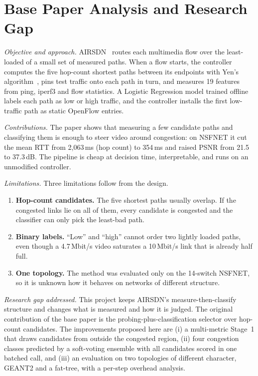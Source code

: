\documentclass[conference,a4paper]{IEEEtran}
\begin{document}
\section{Base Paper Analysis and Research Gap}
\textit{Objective and approach.} AIRSDN~\cite{ipek2025airsdn} routes each multimedia flow over the least-loaded of a
small set of measured paths. When a flow starts, the controller computes the five hop-count shortest paths between
its endpoints with Yen's algorithm~\cite{yen1971kshortest}, pins test traffic onto each path in turn, and measures
19 features from ping, iperf3 and flow statistics. A Logistic Regression model trained offline labels each path as
low or high traffic, and the controller installs the first low-traffic path as static OpenFlow entries.

\textit{Contributions.} The paper shows that measuring a few candidate paths and classifying them is enough to steer
video around congestion: on NSFNET it cut the mean RTT from 2,063\,ms (hop count) to 354\,ms and raised PSNR from
21.5 to 37.3\,dB. The pipeline is cheap at decision time, interpretable, and runs on an unmodified controller.

\textit{Limitations.} Three limitations follow from the design.
\begin{enumerate}
\item \textbf{Hop-count candidates.} The five shortest paths usually overlap. If the congested links lie on all of
them, every candidate is congested and the classifier can only pick the least-bad path.
\item \textbf{Binary labels.} ``Low'' and ``high'' cannot order two lightly loaded paths, even though a 4.7\,Mbit/s
video saturates a 10\,Mbit/s link that is already half full.
\item \textbf{One topology.} The method was evaluated only on the 14-switch NSFNET, so it is unknown how it behaves
on networks of different structure.
\end{enumerate}

\textit{Research gap addressed.} This project keeps AIRSDN's measure-then-classify structure and changes what is
measured and how it is judged. The original contribution of the base paper is the probing-plus-classification
selector over hop-count candidates. The improvements proposed here are (i) a multi-metric Stage~1 that draws
candidates from outside the congested region, (ii) four congestion classes predicted by a soft-voting ensemble
with all candidates scored in one batched call, and (iii) an evaluation on two topologies of different character,
GEANT2 and a fat-tree, with a per-step overhead analysis.
\end{document}

